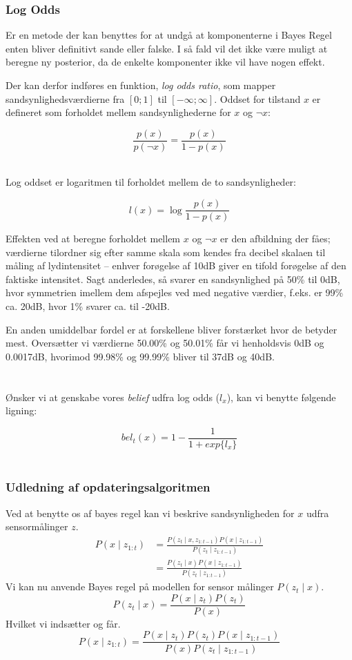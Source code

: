 \subsubsection{Log Odds}
Er en metode der kan benyttes for at undgå at komponenterne i Bayes Regel enten bliver definitivt sande eller falske.
I så fald vil det ikke være muligt at beregne ny posterior, da de enkelte komponenter ikke vil have nogen effekt.

Der kan derfor indføres en funktion, \textit{log odds ratio}, som mapper sandsynlighedsværdierne fra $[0;1]$ til $[-\infty;\infty]$.
Oddset for tilstand $x$ er defineret som forholdet mellem sandsynlighederne for $x$ og $\lnot x$: 

$$\frac{p(x)}{p(\lnot x)} = \frac{p(x)}{1 - p(x)}$$ 

\cite[s. 94]{probabilisticRobotics} \\

Log oddset er logaritmen til forholdet mellem de to sandsynligheder:

$$l(x) = \log \frac{p(x)}{1 - p(x)}$$

Effekten ved at beregne forholdet mellem $x$ og $\neg x$ er den afbildning der fåes; værdierne tilordner sig efter samme skala som kendes fra decibel skalaen til måling af lydintensitet -- enhver forøgelse af 10dB giver en tifold forøgelse af den faktiske intensitet.
Sagt anderledes, så svarer en sandsynlighed på 50\% til 0dB, hvor symmetrien imellem dem afspejles ved med negative værdier, f.eks. er 99\% ca. 20dB, hvor 1\% svarer ca. til -20dB.

En anden umiddelbar fordel er at forskellene bliver forstærket hvor de betyder mest.
Oversætter vi værdierne 50.00\% og 50.01\% får vi henholdsvis 0dB og 0.0017dB, hvorimod 99.98\% og 99.99\% bliver til 37dB og 40dB. \\ \\
\cite[s. 2]{logodds} \\

Ønsker vi at genskabe vores \textit{belief} udfra log odds ($l_x$), kan vi benytte følgende ligning:

$$bel_t(x) = 1 - \frac{1}{1 + exp\{l_x\}}$$ \\
\cite[s. 95]{probabilisticRobotics} 

\subsubsection{Udledning af opdateringsalgoritmen}
Ved at benytte os af bayes regel kan vi beskrive sandsynligheden for $x$ udfra sensormålinger $z$.
\begin{align}
	P(x \mid z_{1:t}) &= \frac{P(z_t \mid x, z_{1:t-1}) P(x \mid z_{1:t-1})}{P(z_t \mid z_{1:t-1})} \\
	&= \frac{P(z_t \mid x) P(x \mid z_{1:t-1})}{P(z_t \mid z_{1:t-1})}
\end{align}
Vi kan nu anvende Bayes regel på modellen for sensor målinger $P(z_t \mid x)$.
$$P(z_t \mid x) = \frac{P(x \mid z_t) P(z_t)}{P(x)}$$
Hvilket vi indsætter og får.
$$P(x \mid z_{1:t}) = \frac{P(x \mid z_t) P(z_t) P(x \mid z_{1:t-1})}{P(x) P(z_t \mid z_{1:t-1})}$$ \\
\cite[s. 95]{probabilisticRobotics} \\

